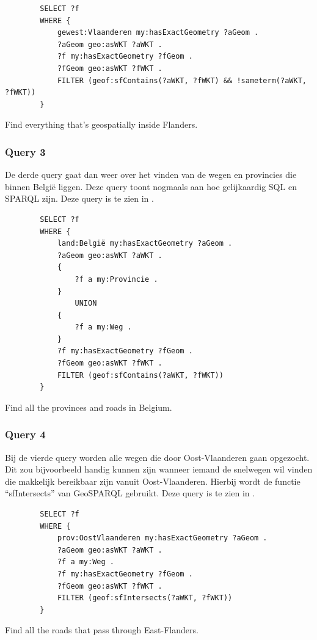 \begin{listing}[ht]
    \begin{verbatim}
        SELECT ?f
        WHERE {
            gewest:Vlaanderen my:hasExactGeometry ?aGeom .
            ?aGeom geo:asWKT ?aWKT .
            ?f my:hasExactGeometry ?fGeom .
            ?fGeom geo:asWKT ?fWKT .
            FILTER (geof:sfContains(?aWKT, ?fWKT) && !sameterm(?aWKT, ?fWKT))
        }
    \end{verbatim}
    \caption{Find everything that's geospatially inside Flanders.}
    \label{listing:find_everything_flanders}
\end{listing}


\subsubsection{Query 3}
De derde query gaat dan weer over het vinden van de wegen en provincies die binnen België liggen. Deze query toont nogmaals aan hoe gelijkaardig SQL en SPARQL zijn. Deze query is te zien in .

\begin{listing}[ht]
    \begin{verbatim}
        SELECT ?f
        WHERE {
            land:België my:hasExactGeometry ?aGeom .
            ?aGeom geo:asWKT ?aWKT .
            {
                ?f a my:Provincie .
            }
                UNION
            {
                ?f a my:Weg .
            }
            ?f my:hasExactGeometry ?fGeom .
            ?fGeom geo:asWKT ?fWKT .
            FILTER (geof:sfContains(?aWKT, ?fWKT))
        }
    \end{verbatim}
    \caption{Find all the provinces and roads in Belgium.}
    \label{listing:find_provinces_roads_belgium}
\end{listing}


\subsubsection{Query 4}
Bij de vierde query worden alle wegen die door Oost-Vlaanderen gaan opgezocht. Dit zou bijvoorbeeld handig kunnen zijn wanneer iemand de snelwegen wil vinden die makkelijk bereikbaar zijn vanuit Oost-Vlaanderen. Hierbij wordt de functie ``sfIntersects'' van GeoSPARQL gebruikt. Deze query is te zien in .

\begin{listing}[ht]
    \begin{verbatim}
        SELECT ?f
        WHERE {
            prov:OostVlaanderen my:hasExactGeometry ?aGeom .
            ?aGeom geo:asWKT ?aWKT .
            ?f a my:Weg .
            ?f my:hasExactGeometry ?fGeom .
            ?fGeom geo:asWKT ?fWKT .
            FILTER (geof:sfIntersects(?aWKT, ?fWKT))
        }
    \end{verbatim}
    \caption{Find all the roads that pass through East-Flanders.}
    \label{listing:find_roads_passing_east_flanders}
\end{listing}


